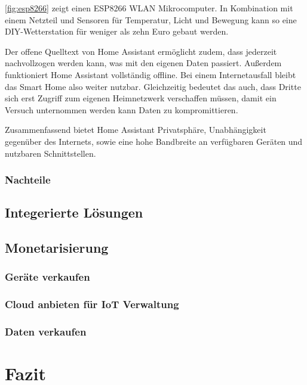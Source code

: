\autoref{fig:esp8266} zeigt einen ESP8266 WLAN Mikrocomputer.
In Kombination mit einem Netzteil und Sensoren für Temperatur, Licht und Bewegung kann so eine \ac{DIY}-Wetterstation für weniger als zehn Euro gebaut werden.

Der offene Quelltext von Home Assistant ermöglicht zudem, dass jederzeit nachvollzogen werden kann, was mit den eigenen Daten passiert.
Außerdem funktioniert Home Assistant vollständig offline.
Bei einem Internetausfall bleibt das Smart Home also weiter nutzbar.
Gleichzeitig bedeutet das auch, dass Dritte sich erst Zugriff zum eigenen Heimnetzwerk verschaffen müssen, damit ein Versuch unternommen werden kann Daten zu kompromittieren.

Zusammenfassend bietet Home Assistant Privatsphäre, Unabhängigkeit gegenüber des Internets, sowie eine hohe Bandbreite an verfügbaren Geräten und nutzbaren Schnittstellen.

\subsubsection{Nachteile}


\subsection{Integerierte Lösungen} %



\subsection{Monetarisierung}

\subsubsection{Geräte verkaufen} %

\subsubsection{Cloud anbieten für IoT Verwaltung} %

\subsubsection{Daten verkaufen}%

\section{Fazit}

